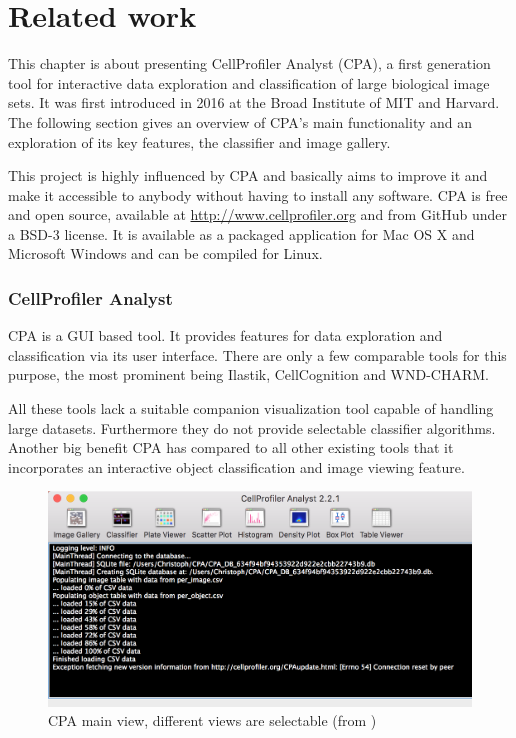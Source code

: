 \chapter{Related work}
This chapter is about presenting CellProfiler Analyst (CPA), a first generation tool for interactive 
data exploration and classification of large biological image sets. 
It was first introduced in 2016 at the Broad Institute of MIT and Harvard. 
The following section gives an overview of CPA's main functionality and an exploration of its key features, 
the classifier and image gallery. 

This project is highly influenced by CPA and basically aims to improve it and make it accessible
to anybody without having to install any software. CPA is free and open source, 
available at \href{http://www.cellprofiler.org}{http://www.cellprofiler.org} and from GitHub under a 
BSD-3 license. It is available as a packaged application for
Mac OS X and Microsoft Windows and can be compiled for Linux.

\subsection{CellProfiler Analyst}
CPA is a GUI based tool. It provides features for data exploration and classification via 
its user interface. There are only a few comparable tools for this purpose, the most prominent being  
Ilastik, CellCognition and WND-CHARM.

All these tools lack a suitable companion visualization tool capable of handling large datasets. 
Furthermore they do not provide selectable classifier algorithms. Another big benefit CPA has compared 
to all other existing tools that it incorporates an interactive object classification and image viewing feature.

\begin{figure}[H]
	\centering
	\includegraphics[width=1.0\linewidth]{bilder/related_work/cpa_main_view.png}
	\caption{CPA main view, different views are selectable  (from \cite{Jones2008})}
	\label{fig:CPA}
\end{figure}

